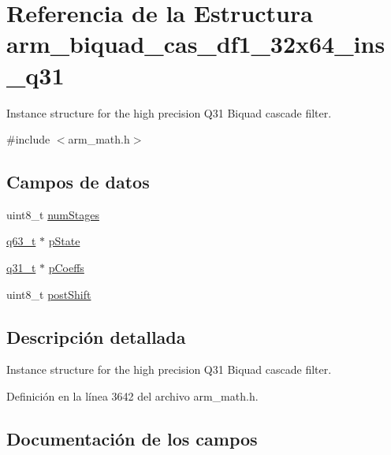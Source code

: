 \hypertarget{structarm__biquad__cas__df1__32x64__ins__q31}{}\section{Referencia de la Estructura arm\+\_\+biquad\+\_\+cas\+\_\+df1\+\_\+32x64\+\_\+ins\+\_\+q31}
\label{structarm__biquad__cas__df1__32x64__ins__q31}


Instance structure for the high precision Q31 Biquad cascade filter.  




{\ttfamily \#include $<$arm\+\_\+math.\+h$>$}

\subsection*{Campos de datos}
\begin{DoxyCompactItemize}
\item 
uint8\+\_\+t \hyperlink{structarm__biquad__cas__df1__32x64__ins__q31_a3615af038f56917909e0370c11bc2ec7}{num\+Stages}
\item 
\hyperlink{arm__math_8h_a5aea1cb12fc02d9d44c8abf217eaa5c6}{q63\+\_\+t} $\ast$ \hyperlink{structarm__biquad__cas__df1__32x64__ins__q31_adefeb77301cc04e4d7d22f323029d588}{p\+State}
\item 
\hyperlink{arm__math_8h_adc89a3547f5324b7b3b95adec3806bc0}{q31\+\_\+t} $\ast$ \hyperlink{structarm__biquad__cas__df1__32x64__ins__q31_a68888e36167d81cb7836db10367a1682}{p\+Coeffs}
\item 
uint8\+\_\+t \hyperlink{structarm__biquad__cas__df1__32x64__ins__q31_a74050e9f36542bd56f4052381a82ae8f}{post\+Shift}
\end{DoxyCompactItemize}


\subsection{Descripción detallada}
Instance structure for the high precision Q31 Biquad cascade filter. 

Definición en la línea 3642 del archivo arm\+\_\+math.\+h.



\subsection{Documentación de los campos}
